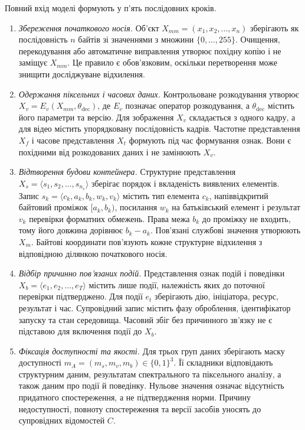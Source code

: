 Повний вхід моделі формують у п’ять послідовних кроків.

\begin{enumerate}
\item \textit{Збереження початкового носія.} Об’єкт $X_{mm}=(x_1,x_2,\ldots,x_n)$ зберігають як послідовність $n$ байтів зі значеннями з множини $\{0,\ldots,255\}$. Очищення, перекодування або автоматичне виправлення утворює похідну копію і не заміщує $X_{mm}$. Це правило є обов’язковим, оскільки перетворення може знищити досліджуване відхилення.

\item \textit{Одержання піксельних і часових даних.} Контрольоване розкодування утворює $X_v=E_v(X_{mm},\theta_{\mathrm{dec}})$, де $E_v$ позначає оператор розкодування, а $\theta_{\mathrm{dec}}$ містить його параметри та версію. Для зображення $X_v$ складається з одного кадру, а для відео містить упорядковану послідовність кадрів. Частотне представлення $X_f$ і часове представлення $X_t$ формують під час формування ознак. Вони є похідними від розкодованих даних і не замінюють $X_v$.

\item \textit{Відтворення будови контейнера.} Структурне представлення $X_s=\langle s_1,s_2,\ldots,s_{n_s}\rangle$ зберігає порядок і вкладеність виявлених елементів. Запис $s_k=\langle c_k,a_k,b_k,w_k,v_k\rangle$ містить тип елемента $c_k$, напіввідкритий байтовий проміжок $[a_k,b_k)$, посилання $w_k$ на батьківський елемент і результат $v_k$ перевірки форматних обмежень. Права межа $b_k$ до проміжку не входить, тому його довжина дорівнює $b_k-a_k$. Пов’язані службові значення утворюють $X_m$. Байтові координати пов’язують кожне структурне відхилення з відповідною ділянкою початкового носія.

\item \textit{Відбір причинно пов’язаних подій.} Представлення ознак подій і поведінки $X_b=\langle e_1,e_2,\ldots,e_T\rangle$ містить лише події, належність яких до поточної перевірки підтверджено. Для події $e_t$ зберігають дію, ініціатора, ресурс, результат і час. Супровідний запис містить фазу оброблення, ідентифікатор запуску та стан середовища. Часовий збіг без причинного зв’язку не є підставою для включення події до $X_b$.

\item \textit{Фіксація доступності та якості.} Для трьох груп даних зберігають маску доступності $m_A=(m_s,m_v,m_b)\in\{0,1\}^3$. Її складники відповідають структурним даним, результатам спектрального та піксельного аналізу, а також даним про події й поведінку. Нульове значення означає відсутність придатного спостереження, а не підтвердження норми. Причину недоступності, повноту спостереження та версії засобів уносять до супровідних відомостей $C$.
\end{enumerate}

